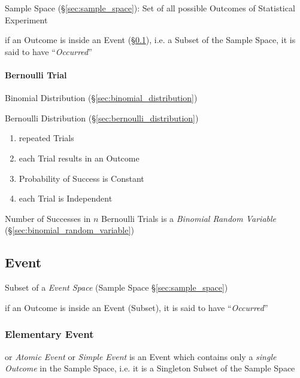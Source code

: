 Sample Space (\S\ref{sec:sample_space}): Set of all possible Outcomes of
Statistical Experiment

if an Outcome is inside an Event (\S\ref{sec:probability_event}), i.e. a Subset
of the Sample Space, it is said to have ``\emph{Occurred}''



\paragraph{Bernoulli Trial}\label{sec:bernoulli_trial}\hfill

Binomial Distribution (\S\ref{sec:binomial_distribution})

Bernoulli Distribution (\S\ref{sec:bernoulli_distribution})

\begin{enumerate}
  \item repeated Trials
  \item each Trial results in an Outcome
  \item Probability of Success is Constant
  \item each Trial is Independent
\end{enumerate}

Number of Successes in $n$ Bernoulli Trials is a \emph{Binomial Random
  Variable} (\S\ref{sec:binomial_random_variable})



\subsection{Event}\label{sec:probability_event}

Subset of a \emph{Event Space} (Sample Space \S\ref{sec:sample_space})

if an Outcome is inside an Event (Subset), it is said to have
``\emph{Occurred}''



\subsubsection{Elementary Event}\label{sec:elementary_event}

or \emph{Atomic Event} or \emph{Simple Event} is an Event which contains only a
\emph{single Outcome} in the Sample Space, i.e. it is a Singleton Subset of the
Sample Space

